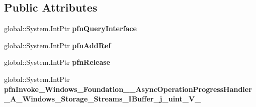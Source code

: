 \subsection*{Public Attributes}
\begin{DoxyCompactItemize}
\item 
\mbox{\label{struct_windows_1_1_foundation_1_1_async_operation_progress_handler___a___windows___storage___stra482c68c8c7180278b02d484f8142a67_a457d2069dc3c2f9fc00a2cce531762f4}} 
global\+::\+System.\+Int\+Ptr {\bfseries pfn\+Query\+Interface}
\item 
\mbox{\label{struct_windows_1_1_foundation_1_1_async_operation_progress_handler___a___windows___storage___stra482c68c8c7180278b02d484f8142a67_a2b8ca8e3cff965b1b4d004be0747e216}} 
global\+::\+System.\+Int\+Ptr {\bfseries pfn\+Add\+Ref}
\item 
\mbox{\label{struct_windows_1_1_foundation_1_1_async_operation_progress_handler___a___windows___storage___stra482c68c8c7180278b02d484f8142a67_a352a1a7af1201cbe90e695ffa65f327d}} 
global\+::\+System.\+Int\+Ptr {\bfseries pfn\+Release}
\item 
\mbox{\label{struct_windows_1_1_foundation_1_1_async_operation_progress_handler___a___windows___storage___stra482c68c8c7180278b02d484f8142a67_a209e1a022b10ca12d98783f884effb26}} 
global\+::\+System.\+Int\+Ptr {\bfseries pfn\+Invoke\+\_\+\+Windows\+\_\+\+Foundation\+\_\+\+\_\+\+Async\+Operation\+Progress\+Handler\+\_\+\+A\+\_\+\+Windows\+\_\+\+Storage\+\_\+\+Streams\+\_\+\+I\+Buffer\+\_\+j\+\_\+uint\+\_\+\+V\+\_\+}
\end{DoxyCompactItemize}

